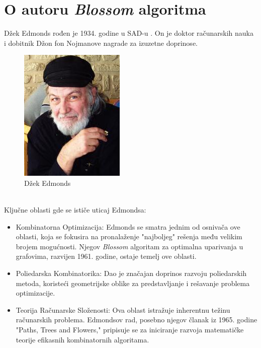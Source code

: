 \documentclass[11pt,a4paper]{article}
\theoremstyle{definition}
\begin{document}
\section{O autoru \textit{Blossom} algoritma}
Džek Edmonds rođen je 1934. godine u SAD-u \cite{sajt4}. On je doktor računarskih nauka i dobitnik Džon fon Nojmanove nagrade za izuzetne doprinose.
\begin{figure}[ht]
\begin{center}
\includegraphics[scale=0.4]{jack_edmonds.jpg}
\end{center}
\caption{Džek Edmonds}
\label{fig:slika 6}
\end{figure}
\\Ključne oblasti gde se ističe uticaj Edmondsa:
\begin{itemize}
\item Kombinatorna Optimizacija: Edmonds se smatra jednim od osnivača ove oblasti, koja se fokusira na pronalaženje "najboljeg" rešenja među velikim brojem mogućnosti. Njegov \textit{Blossom} algoritam za optimalna uparivanja u grafovima, razvijen 1961. godine, ostaje temelj ove oblasti.

\item Poliedarska Kombinatorika: Dao je značajan doprinos razvoju poliedarskih metoda, koristeći geometrijske oblike za predstavljanje i rešavanje problema optimizacije.

\item  Teorija Računarske Složenosti: Ova oblast istražuje inherentnu težinu računarskih problema. Edmondsov rad, posebno njegov članak iz 1965. godine "Paths, Trees and Flowers," pripisuje se za iniciranje razvoja matematičke teorije efikasnih kombinatornih algoritama.
\end{itemize}
\end{document}
